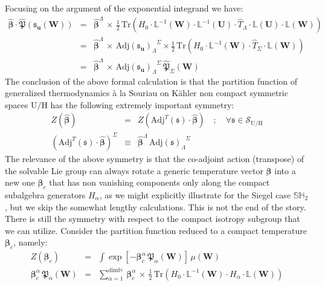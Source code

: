 \documentclass[10pt,a4paper]{article}
\newcommand{\ft}[2]{{\textstyle\frac{#1}{#2}}}
\begin{document}
Focusing on the argument of the exponential integrand we have:
\begin{eqnarray}\label{pignattone}
  \widehat{\boldsymbol{\beta}}\cdot \widehat{\boldsymbol{\mathfrak{P}}}(\mathfrak{s}_\mathbf{u}(\mathbf{W}))
  & = &\widehat{\boldsymbol{\beta}}^\Lambda \, \times \, \ft 12 \, \text{Tr} \left(H_{0} \cdot
  \mathbb{L}^{-1}(\mathbf{W}) \cdot\mathbb{L}^{-1}(\mathbf{U})\cdot \widehat{T}_\Lambda
   \cdot\mathbb{L}(\mathbf{U})\cdot\mathbb{L}(\mathbf{W}) \right) \nonumber \\
   & = & \widehat{\boldsymbol{\beta}}^\Lambda \, \times \, \mathrm{Adj}\left(\mathfrak{s}_\mathbf{u}\right)_\Lambda^{\phantom{\Lambda}\Sigma} \times
   \ft 12 \, \text{Tr} \left(H_{0} \cdot
  \mathbb{L}^{-1}(\mathbf{W})\cdot \widehat{T}_\Sigma \cdot \mathbb{L}(\mathbf{W}) \right) \nonumber\\
  &=& \widehat{\boldsymbol{\beta}}^\Lambda \, \times \, \mathrm{Adj}\left(\mathfrak{s}_\mathbf{u}\right)_\Lambda^{\phantom{\Lambda}\Sigma} \, \widehat{\boldsymbol{\mathfrak{P}}}_\Sigma(\mathbf{W})
\end{eqnarray}
The conclusion of the above formal calculation is that the partition function of generalized thermodynamics {\`a} la Souriau on K\"ahler non compact symmetric spaces $\mathrm{U/H}$ has the following extremely important symmetry:
\begin{eqnarray}\label{invariasolv}
  Z(\widehat{\boldsymbol{\beta}}) & = & Z(\mathrm{Adj}^T(\mathfrak{s})\cdot \widehat{\boldsymbol{\beta}}) \quad ; \quad \forall \mathfrak{s}\in \mathcal{S}_{\mathrm{U/H}} \nonumber\\
  \left(\mathrm{Adj}^T(\mathfrak{s})\cdot \widehat{\boldsymbol{\beta}}\right)^\Sigma & \equiv & \widehat{\boldsymbol{\beta}}^\Lambda \,  \mathrm{Adj}\left(\mathfrak{s}\right)_\Lambda^{\phantom{\Lambda}\Sigma}
\end{eqnarray}
The relevance of the above symmetry is that the co-adjoint action (transpose) of the solvable Lie group can always
rotate a generic temperature vector $\boldsymbol{\beta}$ into a new one $\boldsymbol{\beta}_c$ that has non vanishing components only along the compact subalgebra generators $H_\alpha$, as we might explicitly illustrate for the Siegel case $\mathbb{SH}_2$, but we skip the somewhat lengthy calculations. This is not the end of the story. There is still  the symmetry with respect
to the compact isotropy subgroup that we can utilize. Consider the partition function reduced to a compact temperature $\boldsymbol{\beta}_c$, namely:
\begin{eqnarray}\label{minnesota}
  Z(\boldsymbol{\beta}_c)& = &\int \exp\left[- \boldsymbol{\beta}_c^\alpha \, \boldsymbol{\mathfrak{P}}_\alpha(\mathbf{W})\right] \, \mu(\mathbf{W}) \nonumber\\
  \boldsymbol{\beta}_c^\alpha \, \boldsymbol{\mathfrak{P}}_\alpha(\mathbf{W})& = &\sum_{\alpha=1}^{\text{dim} \mathbb{H}}\, \boldsymbol{\beta}_c^\alpha \, \times \,\ft 12 \, \text{Tr} \left(H_{0} \cdot
  \mathbb{L}^{-1}(\mathbf{W})\cdot H_\alpha \cdot \mathbb{L}(\mathbf{W}) \right)
\end{eqnarray}
\end{document}
